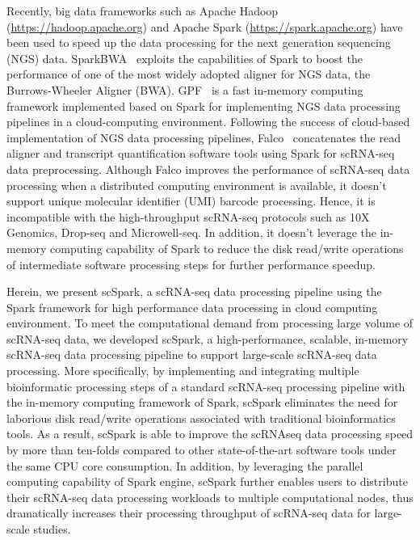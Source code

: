 \documentclass[conference]{IEEEtran}
\begin{document}
Recently, big data frameworks such as Apache Hadoop (\url{https://hadoop.apache.org}) and Apache Spark (\url{https://spark.apache.org}) have been used to speed up the data processing for the next generation sequencing (NGS) data. 
SparkBWA~\cite{Abun2016SparkBWA} exploits the capabilities of Spark to boost the performance of one of the most widely adopted aligner for NGS data, the Burrows-Wheeler Aligner (BWA). 
GPF~\cite{Li2018Highperformance} is a fast in-memory computing framework implemented based on Spark for implementing NGS data processing pipelines in a cloud-computing environment. 
Following the success of cloud-based implementation of NGS data processing pipelines, Falco~\cite{Yang2017Falco} concatenates the read aligner and transcript quantification software tools using Spark for scRNA-seq data preprocessing.
Although Falco improves the performance of scRNA-seq data processing when a distributed computing environment is available, it doesn't support unique molecular identifier (UMI) barcode processing. Hence, it is incompatible with the high-throughput scRNA-seq protocols such as 10X Genomics, Drop-seq and Microwell-seq. In addition, it doesn't leverage the in-memory computing capability of Spark to reduce the disk read/write operations of intermediate software processing steps for further performance speedup.  

Herein, we present scSpark, a scRNA-seq data processing pipeline using the Spark framework for high performance data processing in cloud computing environment. 
To meet the computational demand from processing large volume of scRNA-seq data, 
we developed scSpark, a high-performance, scalable, in-memory scRNA-seq data processing pipeline to support large-scale scRNA-seq data processing. More specifically, 
by implementing and integrating multiple bioinformatic processing steps of a standard scRNA-seq processing pipeline with the in-memory computing framework of Spark, scSpark eliminates the need for laborious disk read/write operations associated with traditional bioinformatics tools.
As a result, scSpark is able to improve the scRNAseq data processing speed by more than ten-folds compared to other state-of-the-art software tools under the same CPU core consumption. In addition, by leveraging the parallel computing capability of Spark engine, scSpark further enables users to distribute their scRNA-seq data processing workloads to multiple computational nodes, thus dramatically increases their processing throughput of scRNA-seq data for large-scale studies. 
\end{document}

